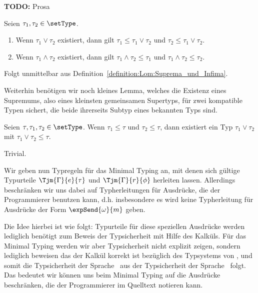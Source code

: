 {\bf TODO:} Prosa

\begin{lemma} \label{lemma:Lom:Suprema_und_Infima}
  Seien $\tau_1,\tau_2 \in \setType$.
  \begin{enumerate}
    \item Wenn $\tau_1 \vee \tau_2$ existiert, dann gilt $\tau_1 \le \tau_1 \vee \tau_2$ und $\tau_2 \le \tau_1\vee\tau_2$.
    \item Wenn $\tau_1\wedge\tau_2$ existiert, dann gilt $\tau_1\wedge\tau_2\le\tau_1$ und $\tau_1\wedge\tau_2\le\tau_2$.
  \end{enumerate}
\end{lemma}

\begin{beweis}
  Folgt unmittelbar aus Definition~\ref{definition:Lom:Suprema_und_Infima}.
\end{beweis}
%
Weiterhin ben\"otigen wir noch kleines Lemma, welches die Existenz eines Supremums, also eines kleinsten
gemeinsamen Supertyps, f\"ur zwei kompatible Typen sichert, die beide ihrerseits Subtyp eines bekannten
Typs sind.

\begin{lemma} \label{lemma:Lom:Existenz_des_Supremums}
  Seien $\tau,\tau_1,\tau_2 \in \setType$. Wenn $\tau_1 \le \tau$ und $\tau_2 \le \tau$, dann existiert ein
  Typ $\tau_1 \vee \tau_2$ mit $\tau_1 \vee \tau_2 \le \tau$.
\end{lemma}

\begin{beweis}
  Trivial.
\end{beweis}

Wir geben nun Typregeln f\"ur das Minimal Typing an, mit denen sich g\"ultige Typurteile $\Tjm{\Gamma}{e}{\tau}$
und $\Tjm{\Gamma}{r}{\phi}$ herleiten lassen. Allerdings beschr\"anken wir uns dabei auf Typherleitungen f\"ur
Ausdr\"ucke, die der Programmierer benutzen kann, d.h. insbesondere es wird keine Typherleitung f\"ur Ausdr\"ucke
der Form $\expSend{\omega}{m}$ geben.

Die Idee hierbei ist wie folgt: Typurteile f\"ur diese speziellen Ausdr\"ucke werden lediglich ben\"otigt
zum Beweis der Typsicherheit mit Hilfe des Kalk\"uls. F\"ur das Minimal Typing werden wir aber Typsicherheit
nicht explizit zeigen, sondern lediglich beweisen das der Kalk\"ul korrekt ist bez\"uglich des Typsystems
von \Losub, und somit die Typsicherheit der Sprache \Lom\ aus der Typsicherheit der Sprache \Losub\ folgt.
Das bedeutet wir k\"onnen uns beim Minimal Typing auf die Ausdr\"ucke beschr\"anken, die der Programmierer
im Quelltext notieren kann.

